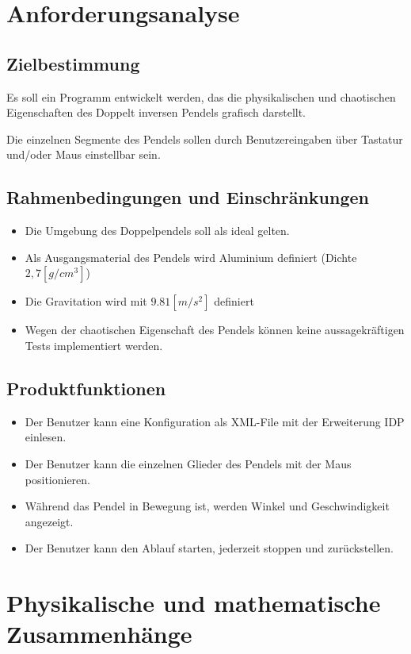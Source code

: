 \documentclass[12pt]{article}
\numberwithin{equation}{subsection}
\begin{document}
\newpage
\section{Anforderungsanalyse}
\subsection{Zielbestimmung}
Es soll ein Programm entwickelt werden, das die physikalischen und chaotischen Eigenschaften des Doppelt inversen Pendels grafisch darstellt.

Die einzelnen Segmente des Pendels sollen durch Benutzereingaben über Tastatur und/oder Maus einstellbar sein.

\subsection{Rahmenbedingungen und Einschränkungen}
\begin{itemize}
	\item Die Umgebung des Doppelpendels soll als ideal gelten.
	\item Als Ausgangsmaterial des Pendels wird Aluminium definiert (Dichte $2,7 [g/cm^3]$)
	\item Die Gravitation wird mit $9.81 [m/s^2]$ definiert
	\item Wegen der chaotischen Eigenschaft des Pendels können keine aussagekräftigen Tests implementiert werden.
\end{itemize}

\subsection{Produktfunktionen}
\begin{itemize}
	\item Der Benutzer kann eine Konfiguration als XML-File mit der Erweiterung IDP einlesen.
	\item Der Benutzer kann die einzelnen Glieder des Pendels mit der Maus positionieren.
	\item Während das Pendel in Bewegung ist, werden Winkel und Geschwindigkeit angezeigt.
	\item Der Benutzer kann den Ablauf starten, jederzeit stoppen und zurückstellen.
\end{itemize}


\newpage
\section{Physikalische und mathematische Zusammenhänge}
\end{document}
